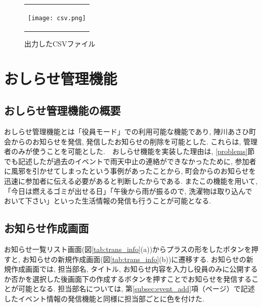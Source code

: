 \begin{figure}[htbp]
  \begin{center}
    \begin{tabular}{c}

      \begin{minipage}{1\hsize}
        \begin{center}
\texttt{[image: csv.png]}
          \hspace{1cm} %
        \end{center}
      \end{minipage}

    \end{tabular}
    \caption{出力したCSVファイル}
    \label{tab:csv}
  \end{center}
\end{figure}

\section{おしらせ管理機能}%
\subsection{おしらせ管理機能の概要}%
おしらせ管理機能とは「役員モード」での利用可能な機能であり, 陣川あさひ町会からのお知らせを発信, 発信したお知らせの削除を可能とした. これらは, 管理者のみが使うことを可能とした.　おしらせ機能を実装した理由は, \ref{problems}節でも記述したが過去のイベントで雨天中止の連絡ができなかったために, 参加者に風邪を引かせてしまったという事例があったことから, 町会からのお知らせを迅速に参加者に伝える必要があると判断したからである. またこの機能を用いて, 「今日は燃えるゴミが出せる日」「午後から雨が振るので, 洗濯物は取り込んでおいて下さい」といった生活情報の発信も行うことが可能となる.


\subsection{お知らせ作成画面}%
お知らせ一覧リスト画面(図\ref{tab:trans_info}(a))からプラスの形をしたボタンを押すと, お知らせの新規作成画面(図\ref{tab:trans_info}(b))に遷移する. お知らせの新規作成画面では, 担当部名, タイトル, お知らせ内容を入力し役員のみに公開するか否かを選択した後画面下の作成するボタンを押すことでお知らせを発信することが可能となる. 担当部名については, 第\ref{subsec:event_add}項（\pageref{subsec:event_add}ページ）で記述したイベント情報の発信機能と同様に担当部ごとに色を付けた.

